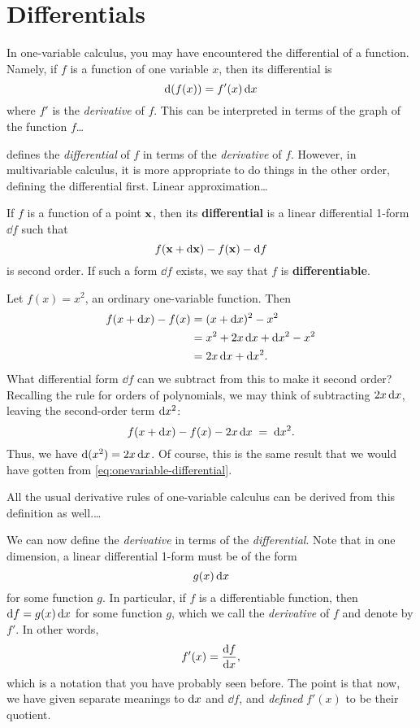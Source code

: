 \documentclass[12pt]{amsart}
\begin{document}
\section{Differentials}
\label{sec:differentials}

In one-variable calculus, you may have encountered the differential of a function.
Namely, if $f$ is a function of one variable $x$, then its differential is
\begin{equation}
  \mathrm{d}(f(x)) = f'(x) \, \mathrm{d} x\label{eq:onevariable-differential}
\end{equation}
where $f'$ is the \emph{derivative} of $f$.
This can be interpreted in terms of the graph of the function $f$\dots

 defines the \emph{differential} of $f$ in terms of the \emph{derivative} of $f$.
However, in multivariable calculus, it is more appropriate to do things in the other order, defining the differential first.
Linear approximation\dots

\begin{defn}
  If $f$ is a function of a point $\mathbf{x}$, then its \textbf{differential} is a linear differential 1-form $\dd f$ such that
  \[ f(\mathbf{x} + \mathrm{d}\mathbf{x}) - f(\mathbf{x}) - \mathrm{d} f \]
  is second order.
  If such a form $\dd f$ exists, we say that $f$ is \textbf{differentiable}.
\end{defn}

\begin{eg}
  Let $f(x) = x^2$, an ordinary one-variable function.
  Then
  \begin{align*}
    f(x + \mathrm{d} x) - f(x) &= (x+\mathrm{d} x)^2 - x^2\\
    &= x^2 + 2 x \, \mathrm{d} x + \mathrm{d} x^2 - x^2\\
    &= 2x \, \mathrm{d} x + \mathrm{d} x ^2.
  \end{align*}
  What differential form $\dd f$ can we subtract from this to make it second order?
  Recalling the rule for orders of polynomials, we may think of subtracting $2x \, \mathrm{d} x$, leaving the second-order term $\mathrm{d} x^2$:
  \[ f(x + \mathrm{d} x) - f(x) - 2x \, \mathrm{d} x \;=\; \mathrm{d} x^2. \]
  Thus, we have $\mathrm{d}(x^2) = 2 x \, \mathrm{d} x$.
  Of course, this is the same result that we would have gotten from \cref{eq:onevariable-differential}.
\end{eg}

All the usual derivative rules of one-variable calculus can be derived from this definition as well.\dots

We can now define the \emph{derivative} in terms of the \emph{differential}.
Note that in one dimension, a linear differential 1-form must be of the form
\[ g(x) \,\mathrm{d} x \]
for some function $g$.
In particular, if $f$ is a differentiable function, then $\mathrm{d} f = g(x) \, \mathrm{d} x$ for some function $g$, which we call the \emph{derivative} of $f$ and denote by $f'$.
In other words,
\[ f'(x) = \frac{\mathrm{d} f}{\mathrm{d} x}, \]
which is a notation that you have probably seen before.
The point is that now, we have given separate meanings to $\mathrm{d} x$ and $\dd f$, and \emph{defined} $f'(x)$ to be their quotient.
\end{document}
